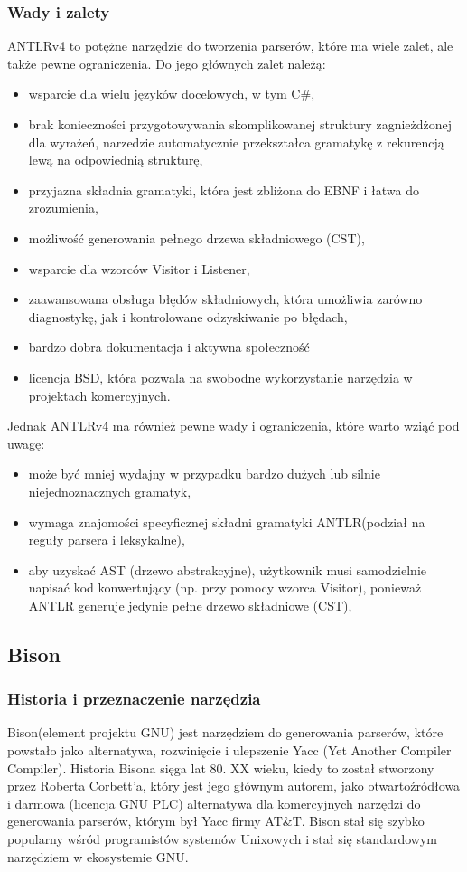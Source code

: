 \documentclass[12pt,twoside]{article}
\begin{document}
\subsubsection{Wady i zalety}
ANTLRv4 to potężne narzędzie do tworzenia parserów, które ma wiele zalet, ale także pewne ograniczenia. 
Do jego głównych zalet należą:
\begin{itemize}[label=\textbullet, leftmargin=1.25cm]
   \item wsparcie dla wielu języków docelowych, w tym C\#,
   \item brak konieczności przygotowywania skomplikowanej struktury zagnieżdżonej dla wyrażeń, narzedzie automatycznie przekształca gramatykę z rekurencją lewą na odpowiednią strukturę,
   \item przyjazna składnia gramatyki, która jest zbliżona do EBNF i łatwa do zrozumienia,
   \item możliwość generowania pełnego drzewa składniowego (CST),
   \item wsparcie dla wzorców Visitor i Listener,
   \item zaawansowana obsługa błędów składniowych, która umożliwia zarówno diagnostykę, jak i kontrolowane odzyskiwanie po błędach,
   \item bardzo dobra dokumentacja i aktywna społeczność
   \item licencja BSD, która pozwala na swobodne wykorzystanie narzędzia w projektach komercyjnych.
\end{itemize}

Jednak ANTLRv4 ma również pewne wady i ograniczenia, które warto wziąć pod uwagę:
\begin{itemize}[label=\textbullet, leftmargin=1.25cm]
   \item może być mniej wydajny w przypadku bardzo dużych lub silnie niejednoznacznych gramatyk,
   \item wymaga znajomości specyficznej składni gramatyki ANTLR(podział na reguły parsera i leksykalne),
   \item aby uzyskać AST (drzewo abstrakcyjne), użytkownik musi samodzielnie napisać kod konwertujący (np. przy pomocy wzorca Visitor), ponieważ ANTLR generuje jedynie pełne drzewo składniowe (CST),
\end{itemize}

\subsection{Bison}

\subsubsection{Historia i przeznaczenie narzędzia}
Bison(element projektu GNU) jest narzędziem do generowania parserów, które powstało jako alternatywa, rozwinięcie i ulepszenie Yacc (Yet Another Compiler Compiler). Historia Bisona sięga lat 80. XX wieku, kiedy to został stworzony przez Roberta Corbett'a, który jest jego głównym autorem, jako otwartoźródłowa i darmowa (licencja GNU PLC) alternatywa dla komercyjnych narzędzi do generowania parserów, którym był Yacc firmy AT\&T. Bison stał się szybko popularny wśród programistów systemów Unixowych i stał się standardowym narzędziem w ekosystemie GNU.
\end{document}
